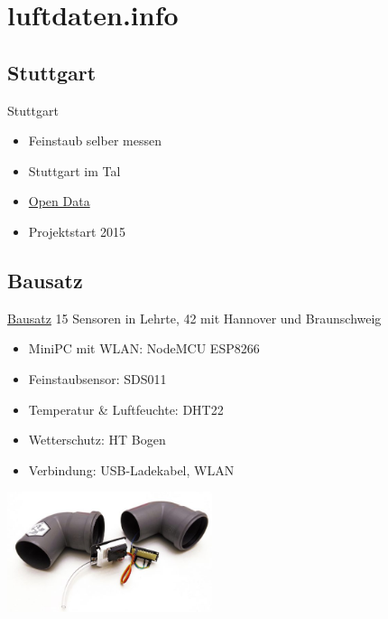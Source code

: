\documentclass[aspectratio=169]{beamer} %
\begin{document}
\section{luftdaten.info}
\subsection{Stuttgart}
\begin{frame}{Stuttgart}
  \begin{itemize}
  \item Feinstaub selber messen
  \item Stuttgart im Tal
  \item \href{https://de.wikipedia.org/wiki/Open_Data}{Open Data}
  \item Projektstart 2015
  \end{itemize}
\end{frame}

\subsection{Bausatz}
\begin{frame}{\href{http://luftdaten.info/feinstaubsensor-bauen/}{Bausatz}}
15 Sensoren in Lehrte, 42 mit Hannover und Braunschweig
  \begin{itemize}
  \item MiniPC mit WLAN: NodeMCU ESP8266
  \item Feinstaubsensor: SDS011
  \item Temperatur \& Luftfeuchte: DHT22
  \item Wetterschutz: HT Bogen
  \item Verbindung: USB-Ladekabel, WLAN
  \end{itemize}
  \begin{center}
    \includegraphics[width=6cm]{../screenshots/Feinstaub-Sensor-Bausatz-e1479558693357.jpg}
  \end{center}
\end{frame}
\end{document}
